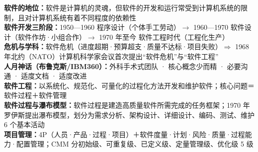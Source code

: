 \documentclass[a4paper,11pt]{article}
\begin{document}

\begin{knowmap}
\textbf{软件的地位：}软件是计算机的灵魂，但软件的开发和运行常受到计算机系统的限制，且对计算机系统有着不同程度的依赖性\\[2pt]
\textbf{软件开发三阶段：}1950—1960 程序设计（个体手工劳动）$\rightarrow$ 1960—1970 软件设计（软件作坊·小组合作）$\rightarrow$ 1970 年至今 软件工程时代（工程化生产）\\[2pt]
\textbf{危机与学科：}软件危机（进度超期·预算超支·质量不达标·项目失败）$\Rightarrow$ 1968 年北约（NATO）计算机科学家会议首次提出“软件危机”与“软件工程”\\[2pt]
\textbf{人月神话（布鲁克斯/IBM360）：}外科手术式团队 · 核心概念少而精 · 必要沟通 · 适度文档 · 适度改进\\[2pt]
\textbf{软件工程：}以系统化、规范化、可量化的过程化方法开发和维护软件；核心问题＝软件过程＋软件管理\\[2pt]
\textbf{软件过程与瀑布模型：}软件过程是建造高质量软件所需完成的任务框架；1970 年罗伊斯提出瀑布模型，划分为需求分析、架构设计、详细设计、编码、测试、维护 6 个基本活动\\[2pt]
\textbf{项目管理：}4P（人员·产品·过程·项目）＋软件度量·计划·风险·质量·过程能力·配置管理；CMM 分初始级、可重复级、已定义级、定量管理级、优化级 5 级
\end{knowmap}
\end{document}
